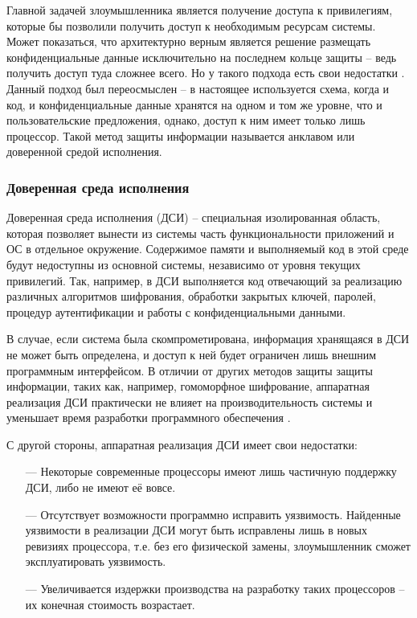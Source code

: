 Главной задачей злоумышленника является получение доступа к привилегиям, которые бы позволили получить доступ к необходимым ресурсам системы. Может показаться, что архитектурно верным является решение размещать конфиденциальные данные исключительно на последнем кольце защиты -- ведь получить доступ туда сложнее всего. Но у такого подхода есть свои недостатки \cite{complex-systems}. Данный подход был переосмыслен -- в настоящее используется схема, когда и код, и конфиденциальные данные хранятся на одном и том же уровне, что и пользовательские предложения, однако, доступ к ним имеет только лишь процессор. Такой метод защиты информации называется анклавом или доверенной средой исполнения.

\subsubsection{Доверенная среда исполнения}

Доверенная среда исполнения (ДСИ) -- специальная изолированная область,  которая позволяет вынести из системы часть функциональности приложений и ОС в отдельное окружение. Содержимое памяти и выполняемый код в этой среде будут недоступны из основной системы, независимо от уровня текущих привилегий. Так, например, в ДСИ выполняется код отвечающий за реализацию различных алгоритмов шифрования, обработки закрытых ключей, паролей, процедур аутентификации и работы с конфиденциальными данными. 

В случае, если система была скомпрометирована, информация хранящаяся в ДСИ не может быть определена, и доступ к ней будет ограничен лишь внешним программным интерфейсом. В отличии от других методов защиты защиты информации, таких как, например, гомоморфное шифрование, аппаратная реализация ДСИ практически не влияет на производительность системы и уменьшает время разработки программного обеспечения \cite{tee}.

С другой стороны, аппаратная реализация ДСИ имеет свои недостатки:

\begin{itemize}
	\item [---] Некоторые современные процессоры имеют лишь частичную поддержку ДСИ, либо не имеют её вовсе.
	\item [---] Отсутствует возможности программно исправить уязвимость. Найденные уязвимости в реализации ДСИ могут быть исправлены лишь в новых ревизиях процессора, т.е. без его физической замены, злоумышленник сможет эксплуатировать уязвимость.
	\item [---] Увеличивается издержки производства на разработку таких процессоров -- их конечная стоимость возрастает.
\end{itemize}


